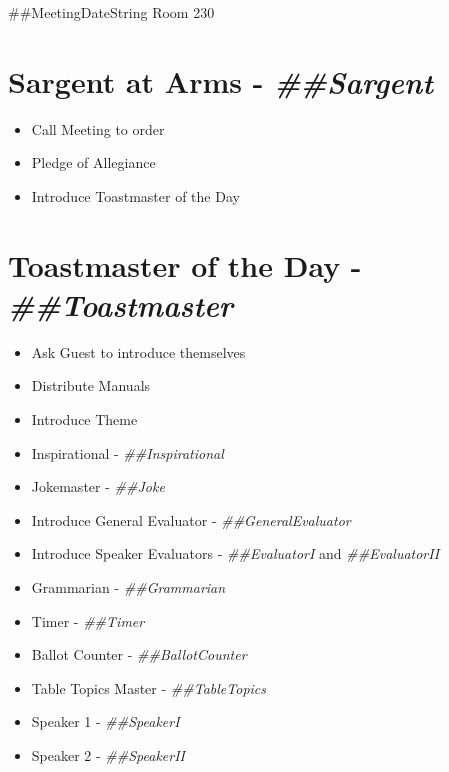 \documentclass{article}
\newcommand{\meetingDateString}{##MeetingDateString}
\newcommand{\toastmaster}{##Toastmaster}
\newcommand{\sargent}{##Sargent}
\newcommand{\tableTopics}{##TableTopics}
\newcommand{\generalEvaluator}{##GeneralEvaluator}
\newcommand{\evaluatorI}{##EvaluatorI}
\newcommand{\evaluatorII}{##EvaluatorII}
\newcommand{\speakerI}{##SpeakerI}
\newcommand{\speakerII}{##SpeakerII}
\newcommand{\grammarian}{##Grammarian}
\newcommand{\timer}{##Timer}
\newcommand{\inspirational}{##Inspirational}
\newcommand{\ballotCounter}{##BallotCounter}
\newcommand{\joke}{##Joke}
\begin{document}
{}
{}
{\centering \meetingDateString{} Room 230 \\}

\begin{spacing}{.6}

\section*{Sargent at Arms - \textit{\sargent{}}}
\begin{itemize}
  \item Call Meeting to order
  \item Pledge of Allegiance
  \item Introduce Toastmaster of the Day
\end{itemize}

\section*{Toastmaster of the Day - \textit{\toastmaster{}}} 
\begin{itemize}
  \item Ask Guest to introduce themselves
  \item Distribute Manuals
  \item Introduce Theme
  \item Inspirational - \textit{\inspirational{}}
  \item Jokemaster - \textit{\joke{}}
  \item Introduce General Evaluator - \textit{\generalEvaluator{}}
  \item Introduce Speaker Evaluators - \textit{\evaluatorI{}} and \textit{\evaluatorII{}}
  \item Grammarian - \textit{\grammarian{}}
  \item Timer - \textit{\timer{}}
  \item Ballot Counter - \textit{\ballotCounter{}}
  \item Table Topics Master - \textit{\tableTopics{}}
  \item Speaker 1 - \textit{\speakerI{}}
  \item Speaker 2 - \textit{\speakerII{}}
\end{itemize}


\end{spacing}
\end{document}
